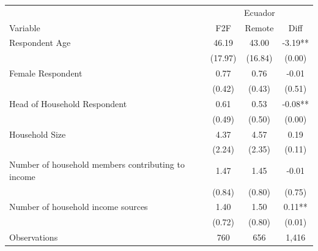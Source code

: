 \begin{tabular}{l*{3}c}
\hline\hline
 & \multicolumn{3}{c}{Ecuador}\\ 
Variable & F2F & Remote & Diff \\
\hline
Respondent Age&46.19&43.00&-3.19**\\
&(17.97)&(16.84)&(0.00)\\
Female Respondent&0.77&0.76&-0.01\\
&(0.42)&(0.43)&(0.51)\\
Head of Household Respondent&0.61&0.53&-0.08**\\
&(0.49)&(0.50)&(0.00)\\
Household Size&4.37&4.57&0.19\\
&(2.24)&(2.35)&(0.11)\\
Number of household members contributing to income&1.47&1.45&-0.01\\
&(0.84)&(0.80)&(0.75)\\
Number of household income sources&1.40&1.50&0.11**\\
&(0.72)&(0.80)&(0.01)\\
\hline
Observations & 760 & 656 & 1,416 \\
\hline\hline
\end{tabular}
